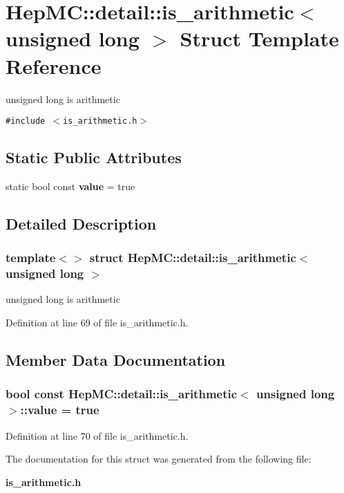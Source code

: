 \section{Hep\-MC::detail::is\_\-arithmetic$<$ unsigned long $>$ Struct Template Reference}
\label{structHepMC_1_1detail_1_1is__arithmetic_3_01unsigned_01long_01_4}
unsigned long is arithmetic  


{\tt \#include $<$is\_\-arithmetic.h$>$}

\subsection*{Static Public Attributes}
\begin{CompactItemize}
\item 
static bool const {\bf value} = true
\end{CompactItemize}


\subsection{Detailed Description}
\subsubsection*{template$<$$>$ struct Hep\-MC::detail::is\_\-arithmetic$<$ unsigned long $>$}

unsigned long is arithmetic 



Definition at line 69 of file is\_\-arithmetic.h.

\subsection{Member Data Documentation}
\subsubsection{\setlength{\rightskip}{0pt plus 5cm}bool const {\bf Hep\-MC::detail::is\_\-arithmetic}$<$ unsigned long $>$::{\bf value} = true\hspace{0.3cm}{\tt  [static]}}\label{structHepMC_1_1detail_1_1is__arithmetic_3_01unsigned_01long_01_4_5337746dfc4a8b11f18c764aafca52b4}




Definition at line 70 of file is\_\-arithmetic.h.

The documentation for this struct was generated from the following file:\begin{CompactItemize}
\item 
{\bf is\_\-arithmetic.h}\end{CompactItemize}

